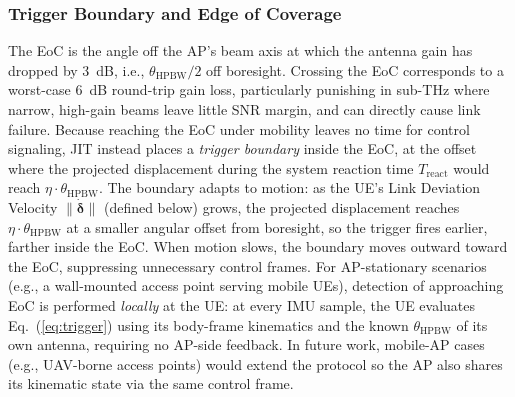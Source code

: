 \documentclass[fleqn,10pt]{wlscirep}
\newcommand{\rev}[1]{{\color{revblue}#1}}
\begin{document}
\rev{\subsubsection*{Trigger Boundary and Edge of Coverage}
The EoC is the angle off the AP's beam axis at which the antenna gain has dropped by \SI{3}{\deci\bel}, i.e., $\theta_{\text{HPBW}}/2$ off boresight. Crossing the EoC corresponds to a worst-case \SI{6}{\deci\bel} round-trip gain loss, particularly punishing in sub-THz where narrow, high-gain beams leave little SNR margin, and can directly cause link failure. Because reaching the EoC under mobility leaves no time for control signaling, JIT instead places a \emph{trigger boundary} inside the EoC, at the offset where the projected displacement during the system reaction time $T_{\text{react}}$ would reach $\eta \cdot \theta_{\text{HPBW}}$. The boundary adapts to motion: as the UE's Link Deviation Velocity $\|\dot{\boldsymbol{\delta}}\|$ (defined below) grows, the projected displacement reaches $\eta \cdot \theta_{\text{HPBW}}$ at a smaller angular offset from boresight, so the trigger fires earlier, farther inside the EoC. When motion slows, the boundary moves outward toward the EoC, suppressing unnecessary control frames. For AP-stationary scenarios (e.g., a wall-mounted access point serving mobile UEs), detection of approaching EoC is performed \emph{locally} at the UE: at every IMU sample, the UE evaluates Eq.~(\ref{eq:trigger}) using its body-frame kinematics and the known $\theta_{\text{HPBW}}$ of its own antenna, requiring no AP-side feedback. In future work, mobile-AP cases (e.g., UAV-borne access points) would extend the protocol so the AP also shares its kinematic state via the same control frame.}
\end{document}
